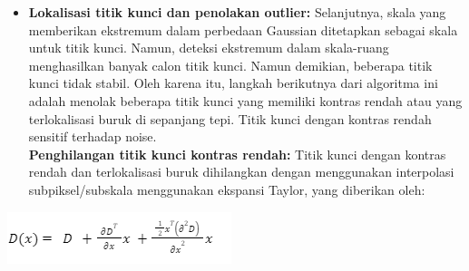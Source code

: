 \documentclass[
  letterpaper,
  DIV=11,
  numbers=noendperiod]{scrreprt}
\providecommand{\tightlist}{%
  \setlength{\itemsep}{0pt}\setlength{\parskip}{0pt}}\usepackage{longtable,booktabs,array}
\begin{document}
\begin{itemize}
\tightlist
\item
  \textbf{Lokalisasi titik kunci dan penolakan outlier:} Selanjutnya,
  skala yang memberikan ekstremum dalam perbedaan Gaussian ditetapkan
  sebagai skala untuk titik kunci. Namun, deteksi ekstremum dalam
  skala-ruang menghasilkan banyak calon titik kunci. Namun demikian,
  beberapa titik kunci tidak stabil. Oleh karena itu, langkah berikutnya
  dari algoritma ini adalah menolak beberapa titik kunci yang memiliki
  kontras rendah atau yang terlokalisasi buruk di sepanjang tepi. Titik
  kunci dengan kontras rendah sensitif terhadap noise.\\
  \textbf{Penghilangan titik kunci kontras rendah:} Titik kunci dengan
  kontras rendah dan terlokalisasi buruk dihilangkan dengan menggunakan
  interpolasi subpiksel/subskala menggunakan ekspansi Taylor, yang
  diberikan oleh:
\end{itemize}

\includegraphics{Asset/image111.png}
\end{document}
